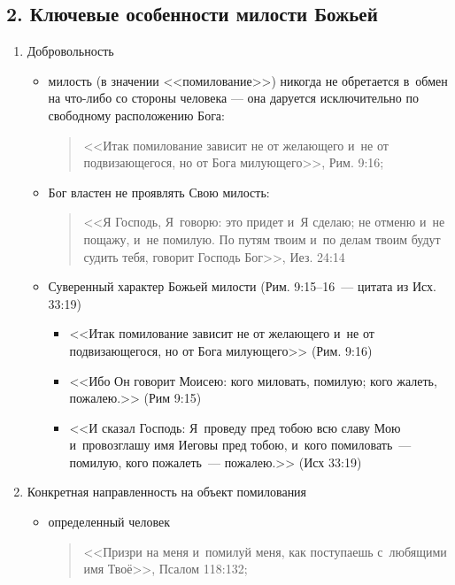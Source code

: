 \documentclass[a4paper,12pt]{article}
\begin{document}
\subsection{2. Ключевые особенности милости Божьей}

\begin{enumerate}
    \item Добровольность
    
    \begin{itemize}
        \item милость (в значении <<помилование>>) никогда не обретается в~обмен на что-либо со стороны человека — она даруется исключительно по свободному расположению Бога:
        \begin{quote}
        <<Итак помилование зависит не от желающего и~не от подвизающегося, но от Бога милующего>>, Рим. 9:16;
        \end{quote}
        \item Бог властен не проявлять Свою милость:
        \begin{quote}
        <<Я Господь, Я~говорю: это придет и~Я сделаю; не отменю и~не пощажу, и~не помилую. По путям твоим и~по делам твоим будут судить тебя, говорит Господь Бог>>, Иез. 24:14
        \end{quote}
        \item Суверенный характер Божьей милости (Рим. 9:15--16~--- цитата из Исх. 33:19)
        \begin{itemize}
        \item <<Итак помилование зависит не от желающего и~не от подвизающегося, но от Бога милующего>> (Рим. 9:16)
        \item <<Ибо Он говорит Моисею: кого миловать, помилую; кого жалеть, пожалею.>> (Рим 9:15)
        \item <<И сказал Господь: Я~проведу пред тобою всю славу Мою и~провозглашу имя Иеговы пред тобою, и~кого помиловать~--- помилую, кого пожалеть~--- пожалею.>> (Исх 33:19)
        \end{itemize}
    \end{itemize}
    
    \item Конкретная направленность на объект помилования
    
    \begin{itemize}
        \item определенный человек
        \begin{quote}
        <<Призри на меня и~помилуй меня, как поступаешь с~любящими имя Твоё>>,  Псалом 118:132;
        \end{quote}


\end{itemize}
\end{enumerate}
\end{document}

